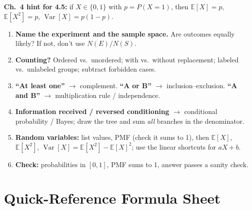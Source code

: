 \documentclass[11pt]{article}
\newcommand{\E}{\mathbb{E}}
\newcommand{\Var}{\operatorname{Var}}
\begin{document}
\textbf{Ch.\ 4 hint for 4.5:} if $X\in\{0,1\}$ with $p=P(X=1)$, then $\E[X]=p$, $\E[X^2]=p$, $\Var[X]=p(1-p)$.

\vspace{4pt}
\begin{tcolorbox}[colback=yellow!8,colframe=yellow!60!black,title={Problem-solving checklist}]
\begin{enumerate}
\item \textbf{Name the experiment and the sample space.} Are outcomes equally likely? If not, don't use $N(E)/N(S)$.
\item \textbf{Counting?} Ordered vs.\ unordered; with vs.\ without replacement; labeled vs.\ unlabeled groups; subtract forbidden cases.
\item \textbf{``At least one''} $\to$ complement. \textbf{``A or B''} $\to$ inclusion--exclusion. \textbf{``A and B''} $\to$ multiplication rule / independence.
\item \textbf{Information received / reversed conditioning} $\to$ conditional probability / Bayes; draw the tree and sum \emph{all} branches in the denominator.
\item \textbf{Random variables:} list values, PMF (check it sums to 1), then $\E[X]$, $\E[X^2]$, $\Var[X]=\E[X^2]-\E[X]^2$; use the linear shortcuts for $aX+b$.
\item \textbf{Check:} probabilities in $[0,1]$, PMF sums to 1, answer passes a sanity check.
\end{enumerate}
\end{tcolorbox}

\section{Quick-Reference Formula Sheet}
\end{document}
